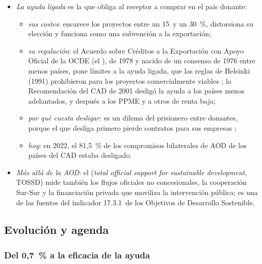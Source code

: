 \documentclass[11pt]{article}
\begin{document}
\begin{itemize}
\item \emph{La ayuda ligada} es la que obliga al receptor a comprar en el país donante:
  \begin{itemize}
  \item \emph{sus costes}: encarece los proyectos entre un 15~y un 30~\%\nocite{Jepma1991Tying}, distorsiona su elección y funciona como una subvención a la exportación;
  \item \emph{su regulación}: el Acuerdo sobre Créditos a la Exportación con Apoyo Oficial de la OCDE (el ), de 1978 y nacido de un consenso de 1976 entre menos países, pone límites a la ayuda ligada, que las reglas de Helsinki (1991) prohibieron para los proyectos comercialmente viables\nocite{OCDE1978Consenso} ; la Recomendación del CAD de 2001 desligó la ayuda a los países menos adelantados, y después a los PPME y a otros de renta baja\nocite{OCDE2018AyudaDesligada};
  \item \emph{por qué cuesta desligar}: es un dilema del prisionero entre donantes, porque el que desliga primero pierde contratos para sus empresas ;
  \item \emph{hoy}: en 2022, el 81,5~\% de los compromisos bilaterales de AOD de los países del CAD estaba desligado\nocite{OCDE2026DAC7b}.
  \end{itemize}
\item \emph{Más allá de la AOD}: el  (\emph{total official support for sustainable development}, TOSSD) mide también los flujos oficiales no concesionales, la cooperación Sur-Sur y la financiación privada que moviliza la intervención pública; es una de las fuentes del indicador 17.3.1~de los Objetivos de Desarrollo Sostenible\nocite{TOSSD2022}.
\end{itemize}

\subsection{Evolución y agenda}\label{sec:aod-agenda}

\subsubsection{Del 0,7~\% a la eficacia de la ayuda}\label{sec:aod-eficacia-agenda}
\end{document}
